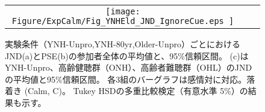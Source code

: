 
\begin{figure}[t]
  
  
  \begin{tabular}{ccc}
  
  \begin{minipage} {0.32\hsize}
  \centering
  \texttt{[image: Figure/ExpCalm/Fig\_YNHEld\_JND\_IgnoreCue.eps ]}
  \end{minipage}&
  
  \begin{minipage} {0.32\hsize}
  \centering
  \includegraphics [ width = 1\columnwidth]{Figure/ExpCalm/Fig_YNHEld_PSE_IgnoreCue.eps }
  \end{minipage}&

  \begin{minipage} {0.32\hsize}
  \centering
  \includegraphics [ width = 1\columnwidth]{Figure/ExpCalm/Fig2c_CalEmoYNHEld_JNDNHHL_Mean4_Thrsh22dB.eps }
  \end{minipage}
  

  \end{tabular}
  
  \vspace {-6pt}
  \caption{実験条件（YNH-Unpro,YNH-80yr,Older-Unpro）ごとにおけるJND(a)とPSE(b)の参加者全体の平均値と、95\%信頼区間。
            (c)はYNH-Unpro、高齢健聴群（ONH）、高齢者難聴群（OHL）のJNDの平均値と95\%信頼区間。
            各3組のバーグラフは感情対に対応。落着き (Calm, C)。
            Tukey HSDの多重比較検定（有意水準 5\%）の結果も示す。}
  
  \label{fig:JNDPSE_Calm}

  \end{figure}


